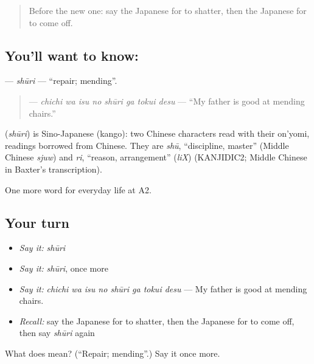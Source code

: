 \begin{quote}
Before the new one: say the Japanese for to shatter, then the Japanese for to come off.
\end{quote}

\subsection*{You'll want to know: }
\textbf{} — \emph{shūri} — \textquotedblleft{}repair; mending\textquotedblright{}.

\begin{quote}
\textbf{   } — \emph{chichi wa isu no shūri ga tokui desu} — \textquotedblleft{}My father is good at mending chairs.\textquotedblright{}
\end{quote}

\begin{cousinweb}
\textbf{} (\emph{shūri}) is Sino-Japanese (kango): two Chinese characters read with their on'yomi, readings borrowed from Chinese. They are \emph{shū}, \textquotedblleft{}discipline, master\textquotedblright{} (Middle Chinese \emph{sjuw}) and \emph{ri}, \textquotedblleft{}reason, arrangement\textquotedblright{} (\emph{liX}) (KANJIDIC2; Middle Chinese in Baxter's transcription).
\end{cousinweb}

\begin{grammarlens}[title={What you've built}]
One more word for everyday life at A2.
\end{grammarlens}

\subsection*{Your turn}
\begin{itemize}
\raggedright
  \item \emph{Say it:} \emph{shūri}
  \item \emph{Say it:} \emph{shūri}, once more
  \item \emph{Say it:} \emph{chichi wa isu no shūri ga tokui desu} — My father is good at mending chairs.
  \item \emph{Recall:} say the Japanese for to shatter, then the Japanese for to come off, then say \emph{shūri} again
\end{itemize}

\begin{tcolorbox}[breakable,colback=teal!4,colframe=teal!35!black,title={Before you move on}]
What does  mean? (\textquotedblleft{}Repair; mending\textquotedblright{}.) Say it once more.
\end{tcolorbox}
